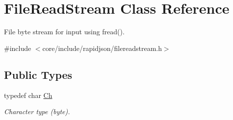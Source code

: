 \hypertarget{classFileReadStream}{}\section{File\+Read\+Stream Class Reference}
\label{classFileReadStream}


File byte stream for input using fread().  




{\ttfamily \#include $<$core/include/rapidjson/filereadstream.\+h$>$}

\subsection*{Public Types}
\begin{DoxyCompactItemize}
\item 
typedef char \hyperlink{classFileReadStream_ae1f83d9ca3c76d1d151af0b6c427f046}{Ch}
\begin{DoxyCompactList}\small\item\em Character type (byte). \end{DoxyCompactList}\end{DoxyCompactItemize}
